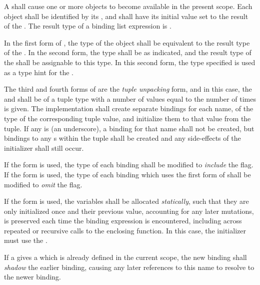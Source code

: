 \specsubsubitem
A  shall cause one or more objects to become
available in the present scope. Each object shall be identified by its
, and shall have its initial value set to the result of the
. The result
type of a binding list expression is .

\specsubsubitem
In the first form of , the type of the object shall
be equivalent to the result type of the . In the
second form, the type shall be as indicated, and the result type of the
 shall be assignable to this type. In this second form,
the type specified is used as a type hint for the .

\specsubsubitem
The third and fourth forms of  are the \textit{tuple
unpacking} form, and in this case, the  and
 shall be of a tuple type with a number of values equal
to the number of times  is given. The implementation shall
create separate bindings for each name, of the type of the corresponding tuple
value, and initialize them to that value from the tuple. If any
 is \terminal{\_} (an underscore), a binding for that
name shall not be created, but bindings to any s within the tuple
shall be created and any side-effects of the initializer shall still occur.

\specsubsubitem
If the  form is used, the type of each binding shall be
modified to \textit{include} the  flag. If the 
form is used, the type of each binding which uses the first form of
 shall be modified to \textit{omit} the 
flag.

\specsubsubitem
If the  form is used, the variables shall be allocated
\textit{statically}, such that they are only initialized once and their
previous value, accounting for any later mutations, is preserved each time
the binding expression is encountered, including across repeated or recursive
calls to the enclosing function. In this case, the initializer must use the
.

\specsubsubitem
If a  gives a  which is already defined
in the current scope, the new binding shall \textit{shadow} the earlier
binding, causing any later references to this name to resolve to the newer
binding.

